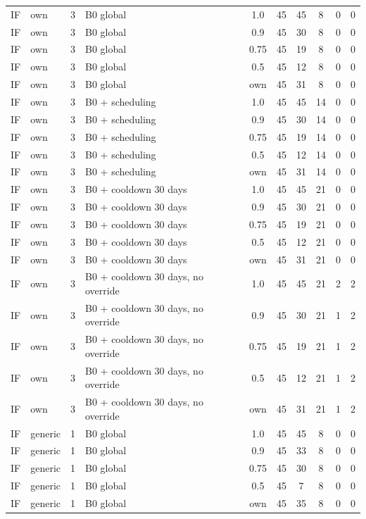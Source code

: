 \begin{longtable}{lllp{4.4cm}cccccc}
IF & own & 3 & B0 global & 1.0 & 45 & 45 & 8 & 0 & 0 \\
IF & own & 3 & B0 global & 0.9 & 45 & 30 & 8 & 0 & 0 \\
IF & own & 3 & B0 global & 0.75 & 45 & 19 & 8 & 0 & 0 \\
IF & own & 3 & B0 global & 0.5 & 45 & 12 & 8 & 0 & 0 \\
IF & own & 3 & B0 global & own & 45 & 31 & 8 & 0 & 0 \\
IF & own & 3 & B0 + scheduling & 1.0 & 45 & 45 & 14 & 0 & 0 \\
IF & own & 3 & B0 + scheduling & 0.9 & 45 & 30 & 14 & 0 & 0 \\
IF & own & 3 & B0 + scheduling & 0.75 & 45 & 19 & 14 & 0 & 0 \\
IF & own & 3 & B0 + scheduling & 0.5 & 45 & 12 & 14 & 0 & 0 \\
IF & own & 3 & B0 + scheduling & own & 45 & 31 & 14 & 0 & 0 \\
IF & own & 3 & B0 + cooldown 30 days & 1.0 & 45 & 45 & 21 & 0 & 0 \\
IF & own & 3 & B0 + cooldown 30 days & 0.9 & 45 & 30 & 21 & 0 & 0 \\
IF & own & 3 & B0 + cooldown 30 days & 0.75 & 45 & 19 & 21 & 0 & 0 \\
IF & own & 3 & B0 + cooldown 30 days & 0.5 & 45 & 12 & 21 & 0 & 0 \\
IF & own & 3 & B0 + cooldown 30 days & own & 45 & 31 & 21 & 0 & 0 \\
IF & own & 3 & B0 + cooldown 30 days, no override & 1.0 & 45 & 45 & 21 & 2 & 2 \\
IF & own & 3 & B0 + cooldown 30 days, no override & 0.9 & 45 & 30 & 21 & 1 & 2 \\
IF & own & 3 & B0 + cooldown 30 days, no override & 0.75 & 45 & 19 & 21 & 1 & 2 \\
IF & own & 3 & B0 + cooldown 30 days, no override & 0.5 & 45 & 12 & 21 & 1 & 2 \\
IF & own & 3 & B0 + cooldown 30 days, no override & own & 45 & 31 & 21 & 1 & 2 \\
IF & generic & 1 & B0 global & 1.0 & 45 & 45 & 8 & 0 & 0 \\
IF & generic & 1 & B0 global & 0.9 & 45 & 33 & 8 & 0 & 0 \\
IF & generic & 1 & B0 global & 0.75 & 45 & 30 & 8 & 0 & 0 \\
IF & generic & 1 & B0 global & 0.5 & 45 & 7 & 8 & 0 & 0 \\
IF & generic & 1 & B0 global & own & 45 & 35 & 8 & 0 & 0 \\

\end{longtable}
